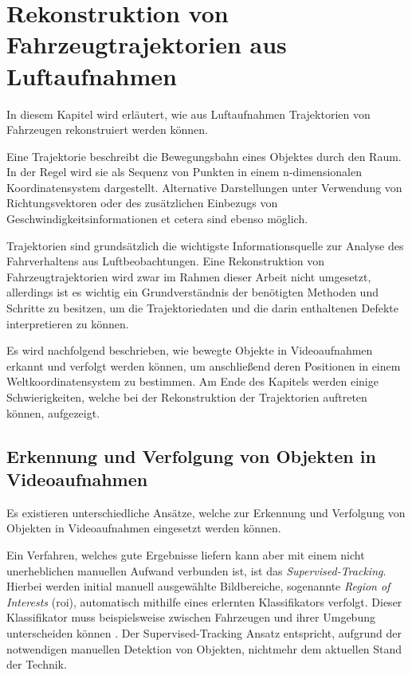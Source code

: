 
\chapter{Rekonstruktion von Fahrzeugtrajektorien aus Luftaufnahmen}
\label{sec:position_extraction}

In diesem Kapitel wird erläutert, wie aus Luftaufnahmen Trajektorien von Fahrzeugen rekonstruiert werden können.

\begin{theorem}[Trajektorie]
    Eine Trajektorie beschreibt die Bewegungsbahn eines Objektes durch den Raum.
    In der Regel wird sie als Sequenz von Punkten in einem n-dimensionalen Koordinatensystem dargestellt.
    Alternative Darstellungen unter Verwendung von Richtungsvektoren oder des zusätzlichen
    Einbezugs von Geschwindigkeitsinformationen et cetera sind ebenso möglich.
\end{theorem}

Trajektorien sind grundsätzlich die wichtigste Informationsquelle zur Analyse des Fahrverhaltens aus Luftbeobachtungen.
Eine Rekonstruktion von Fahrzeugtrajektorien wird zwar im Rahmen dieser Arbeit nicht umgesetzt,
allerdings ist es wichtig ein Grundverständnis der benötigten Methoden und Schritte zu besitzen,
um die Trajektoriedaten und die darin enthaltenen Defekte interpretieren zu können.

Es wird nachfolgend beschrieben, wie bewegte Objekte in Videoaufnahmen erkannt und verfolgt
werden können, um anschließend deren Positionen in einem Weltkoordinatensystem zu bestimmen. Am Ende des Kapitels
werden einige Schwierigkeiten, welche bei der Rekonstruktion der Trajektorien auftreten können, aufgezeigt.

\section{Erkennung und Verfolgung von Objekten in Videoaufnahmen}

Es existieren unterschiedliche Ansätze, welche zur Erkennung und Verfolgung von Objekten in Videoaufnahmen eingesetzt werden können.

Ein Verfahren, welches gute Ergebnisse liefern kann aber mit einem nicht unerheblichen manuellen Aufwand verbunden ist,
ist das \textit{Supervised-Tracking}. Hierbei werden initial manuell ausgewählte Bildbereiche, sogenannte
\textit{Region of Interests} (\acrshort*{roi}), automatisch mithilfe eines erlernten Klassifikators verfolgt.
Dieser Klassifikator muss beispielsweise zwischen Fahrzeugen und ihrer Umgebung unterscheiden können \cite[]{Grabner}.
Der Supervised-Tracking Ansatz entspricht, aufgrund der notwendigen manuellen Detektion von Objekten, nichtmehr
dem aktuellen Stand der Technik.

